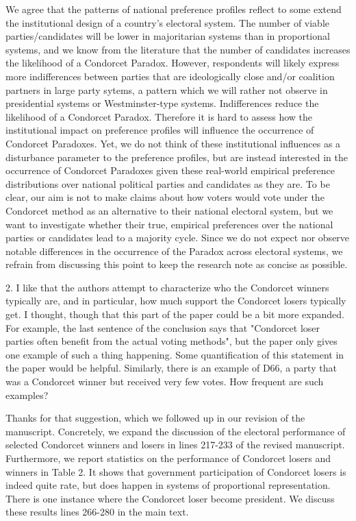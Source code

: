 \documentclass[a4paper, 12pt]{scrartcl}
\theoremstyle{break}
\newenvironment{changes}{\par\color{violet}\par\addvspace{\baselineskip}}{\par\addvspace{\baselineskip}}
\begin{document}
We agree that the patterns of national preference profiles reflect to some extend the institutional design of a country's electoral system. The number of viable parties/candidates will be lower in majoritarian systems than in proportional systems, and we know from the literature that the number of candidates increases the likelihood of a Condorcet Paradox. However, respondents will likely express more indifferences between parties that are ideologically close and/or coalition partners in large party sytems, a pattern which we will rather not observe in presidential systems or Westminster-type systems. Indifferences reduce the likelihood of a Condorcet Paradox. Therefore it is hard to assess how the institutional impact on preference profiles will influence the occurrence of Condorcet Paradoxes. Yet, we do not think of these institutional influences as a disturbance parameter to the preference profiles, but are instead interested in the occurrence of Condorcet Paradoxes given these real-world empirical preference distributions over national political parties and candidates as they are. To be clear, our aim is not to make claims about how voters would vote under the Condorcet method as an alternative to their national electoral system, but we want to investigate whether their true, empirical preferences over the national parties or candidates lead to a majority cycle. Since we do not expect nor observe notable differences in the occurrence of the Paradox across electoral systems, we refrain from discussing this point to keep the research note as concise as possible.

\begin{changes}
	2. I like that the authors attempt to characterize who the Condorcet winners typically are, and in particular, how much support the Condorcet losers typically get. I thought, though that this part of the paper could be a bit more expanded. For example, the last sentence of the conclusion says that "Condorcet loser parties often benefit from the actual voting methods", but the paper only gives one example of such a thing happening. Some quantification of this statement in the paper would be helpful. Similarly, there is an example of D66, a party that was a Condorcet winner but received very few votes. How frequent are such examples?
\end{changes}

Thanks for that suggestion, which we followed up in our revision of the manuscript. Concretely, we expand the discussion of the electoral performance of selected Condorcet winners and losers in lines 217-233 of the revised manuscript.  Furthermore, we report statistics on the performance of Condorcet losers and winners in Table 2. It shows that government participation of Condorcet losers is indeed quite rate, but does happen in systems of proportional representation. There is one instance where the Condorcet loser become president. We discuss these results lines 266-280 in the main text.
\end{document}
